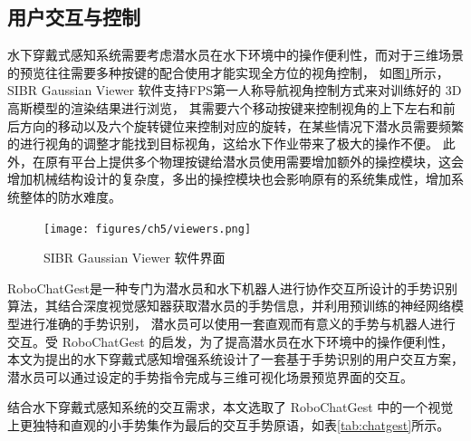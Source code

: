 \subsection{用户交互与控制}
水下穿戴式感知系统需要考虑潜水员在水下环境中的操作便利性，而对于三维场景的预览往往需要多种按键的配合使用才能实现全方位的视角控制，
如图\ref{img:gaussianviewer}所示，SIBR Gaussian Viewer 软件支持FPS第一人称导航视角控制方式来对训练好的 3D 高斯模型的渲染结果进行浏览，
其需要六个移动按键来控制视角的上下左右和前后方向的移动以及六个旋转键位来控制对应的旋转，在某些情况下潜水员需要频繁的进行视角的调整才能找到目标视角，这给水下作业带来了极大的操作不便。
此外，在原有平台上提供多个物理按键给潜水员使用需要增加额外的操控模块，这会增加机械结构设计的复杂度，多出的操控模块也会影响原有的系统集成性，增加系统整体的防水难度。
\begin{figure}[ht]
    \centering
    \vspace{0,4cm}
    \texttt{[image: figures/ch5/viewers.png]}
    \caption{SIBR Gaussian Viewer 软件界面}
    \label{img:gaussianviewer}
\end{figure}

RoboChatGest\cite{robochatgest}是一种专门为潜水员和水下机器人进行协作交互所设计的手势识别算法，其结合深度视觉感知器获取潜水员的手势信息，并利用预训练的神经网络模型进行准确的手势识别，
潜水员可以使用一套直观而有意义的手势与机器人进行交互。受 RoboChatGest 的启发，为了提高潜水员在水下环境中的操作便利性，本文为提出的水下穿戴式感知增强系统设计了一套基于手势识别的用户交互方案，潜水员可以通过设定的手势指令完成与三维可视化场景预览界面的交互。

结合水下穿戴式感知系统的交互需求，本文选取了 RoboChatGest 中的一个视觉上更独特和直观的小手势集作为最后的交互手势原语，如表\ref{tab:chatgest}所示。

